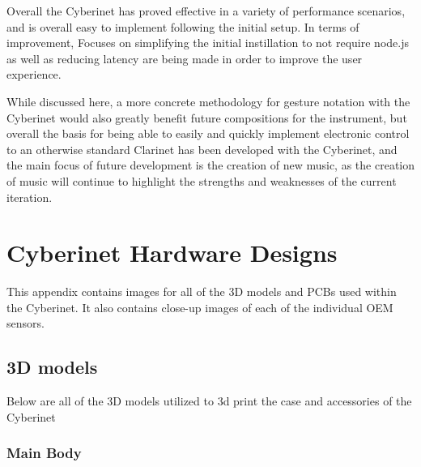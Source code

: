 Overall the Cyberinet has proved effective in a variety of performance scenarios, and is overall easy to implement following the initial setup. In terms of improvement, Focuses on simplifying the initial instillation to not require node.js as well as reducing latency are being made in order to improve the user experience.

While discussed here, a more concrete methodology for gesture notation with the Cyberinet would also greatly benefit future compositions for the instrument, but overall the basis for being able to easily and quickly implement electronic control to an otherwise standard Clarinet has been developed with the Cyberinet, and the main focus of future development is the creation of new music, as the creation of music will continue to highlight the strengths and weaknesses of the current iteration.

\appendix

\chapter{Cyberinet Hardware Designs}
This appendix contains images for all of the 3D models and PCBs used within the Cyberinet. It also contains close-up images of each of the individual OEM sensors.

\section{3D models}
Below are all of the 3D models utilized to 3d print the case and accessories of the Cyberinet

\subsection{Main Body}

